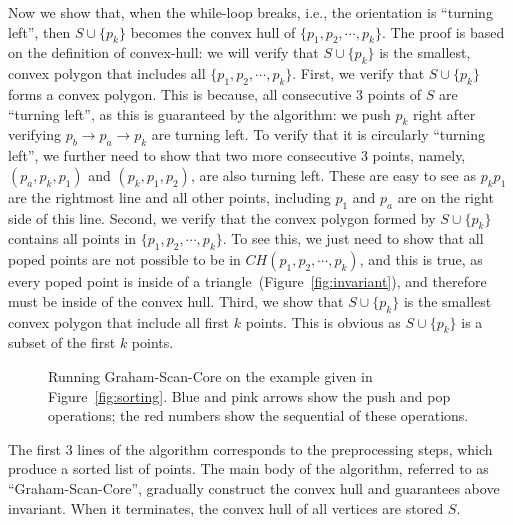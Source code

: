 

Now we show that, when the while-loop breaks, i.e., the orientation is ``turning left'', then  
$S\cup \{p_k\}$ becomes the convex hull of $\{p_1, p_2, \cdots, p_k\}$.
The proof is based on the definition of convex-hull: we will verify that $S\cup \{p_k\}$ is the smallest, convex polygon that includes all $\{p_1, p_2, \cdots, p_k\}$.
First, we verify that $S\cup \{p_k\}$ forms a convex polygon. This is because, all consecutive 3 points of $S$ are ``turning left'', as this is guaranteed by the algorithm: 
we push $p_k$ right after verifying $p_b\to p_a\to p_k$ are turning left.
To verify that it is circularly ``turning left'', we further need to show that two more consecutive 3 points, namely, $(p_a, p_k, p_1)$ and $(p_k, p_1, p_2)$,
are also turning left.  These are easy to see as $p_kp_1$ are the rightmost line and all other points, including $p_1$ and $p_a$ are on the right side of this line.
Second, we verify that the convex polygon formed by $S\cup \{p_k\}$ contains all points in $\{p_1,p_2,\cdots, p_k\}$.
To see this, we just need to show that all poped points are not possible to be in $CH(p_1, p_2, \cdots, p_k)$,
and this is true, as every poped point is inside of a triangle~(Figure~\ref{fig:invariant}), and therefore must be inside of the convex hull. %
Third, we show that $S\cup \{p_k\}$ is the smallest convex polygon that include all first $k$ points.
This is obvious as $S\cup \{p_k\}$ is a subset of the first $k$ points.


\begin{figure}[h!]
\centering{}
\caption{Running Graham-Scan-Core on the example given in Figure~\ref{fig:sorting}.
Blue and pink arrows show the push and pop operations; the red numbers show
the sequential of these operations.}
\end{figure}


The first 3 lines of the algorithm corresponds to the preprocessing steps,
which produce a sorted list of points. The main body of the algorithm, referred
to as ``Graham-Scan-Core'', gradually construct the convex hull and guarantees
above invariant. When it terminates, the convex hull of all vertices
are stored $S$.

